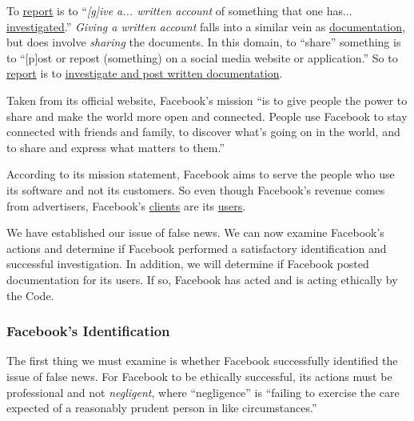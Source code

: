 \par To \ul{report} is to ``\emph{[g]ive a... written account} of something that one has... \ul{investigated}.'' \cite{oxford} \emph{Giving a written account} falls into a similar vein as \ul{documentation}, but does involve \emph{sharing} the documents. In this domain, to ``share'' something is to ``[p]ost or repost (something) on a social media website or application.'' \cite{oxford} So to \ul{report} is to \ul{investigate and post written documentation}.

\label{mission}

\par Taken from its official website, Facebook's mission ``is to give people the power to share and make the world more open and connected. People use Facebook to stay connected with friends and family, to discover what's going on in the world, and to share and express what matters to them.'' \cite{fb_newsroom}

\par According to its mission statement, Facebook aims to serve the people who use its software and not its customers. So even though Facebook's revenue comes from advertisers, \cite{fb_4q2016} Facebook's \ul{clients} are its \ul{users}.


\par We have established our issue of false news. We can now examine Facebook's actions and determine if Facebook performed a satisfactory identification and successful investigation. In addition, we will determine if Facebook posted documentation for its users. If so, Facebook has acted and is acting ethically by the Code.

\subsubsection{Facebook's Identification}

\par The first thing we must examine is whether Facebook successfully identified the issue of false news. For Facebook to be ethically successful, its actions must be professional and not \emph{negligent}, where ``negligence'' is ``failing to exercise the care expected of a reasonably prudent person in like circumstances.'' \cite{merriam_webster}

